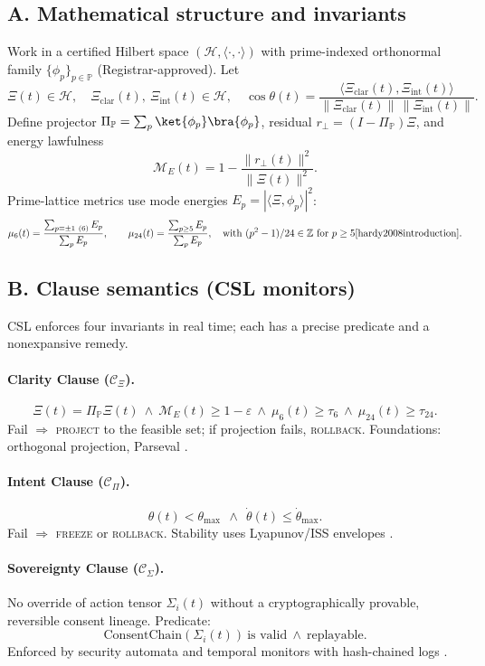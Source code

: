 \documentclass[12pt]{amsart}
\theoremstyle{plain}
\begin{document}
\subsection*{A. Mathematical structure and invariants}
Work in a certified Hilbert space $(\mathcal{H},\langle\cdot,\cdot\rangle)$ with prime-indexed orthonormal family $\{\phi_p\}_{p\in\mathbb{P}}$ (Registrar-approved). Let
\[
\Xi(t)\in\mathcal{H},\quad \Xi_{\mathrm{clar}}(t),\ \Xi_{\mathrm{int}}(t)\in\mathcal{H},\quad
\cos\theta(t)=\frac{\langle \Xi_{\mathrm{clar}}(t),\Xi_{\mathrm{int}}(t)\rangle}{\|\Xi_{\mathrm{clar}}(t)\|\,\|\Xi_{\mathrm{int}}(t)\|}.
\]
Define projector $\Pi_{\mathbb{P}}=\sum_p \ket{\phi_p}\bra{\phi_p}$, residual $r_\perp=(I-\Pi_{\mathbb{P}})\Xi$, and energy lawfulness
\[
\mathcal{M}_E(t)=1-\frac{\|r_\perp(t)\|^2}{\|\Xi(t)\|^2}.
\]
Prime-lattice metrics use mode energies $E_p=|\langle \Xi,\phi_p\rangle|^2$:
\[
\mu_6(t)=\frac{\sum_{p\equiv\pm1\ (6)}E_p}{\sum_p E_p},\qquad
\mu_{24}(t)=\frac{\sum_{p\ge 5}E_p}{\sum_p E_p},\quad \text{with }(p^2-1)/24\in\mathbb{Z}\text{ for }p\ge5 \cite{hardy2008introduction}.
\]

\subsection*{B. Clause semantics (CSL monitors)}
CSL enforces four invariants in real time; each has a precise predicate and a nonexpansive remedy.

\paragraph{Clarity Clause ($\mathcal{C}_\Xi$).}
\[
\Xi(t)=\Pi_{\mathbb{P}}\Xi(t)\ \wedge\ \mathcal{M}_E(t)\ge 1-\varepsilon\ \wedge\ \mu_6(t)\ge\tau_6\ \wedge\ \mu_{24}(t)\ge\tau_{24}.
\]
Fail $\Rightarrow$ \textsc{project} to the feasible set; if projection fails, \textsc{rollback}. Foundations: orthogonal projection, Parseval \cite{rudin1991functional,conway1990functional,lax2002functional}.

\paragraph{Intent Clause ($\mathcal{C}_\Pi$).}
\[
\theta(t)<\theta_{\max}\ \ \wedge\ \ \dot\theta(t)\le \dot\theta_{\max}.
\]
Fail $\Rightarrow$ \textsc{freeze} or \textsc{rollback}. Stability uses Lyapunov/ISS envelopes \cite{khalil2002nonlinear}.

\paragraph{Sovereignty Clause ($\mathcal{C}_\Sigma$).}
No override of action tensor $\Sigma_i(t)$ without a cryptographically provable, reversible consent lineage. Predicate:
\[
\mathrm{ConsentChain}(\Sigma_i(t))\ \text{is valid} \ \wedge\ \text{replayable}.
\]
Enforced by security automata and temporal monitors with hash-chained logs \cite{schneider2000enforceable,clarke1999model,baier2008model}.
\end{document}
